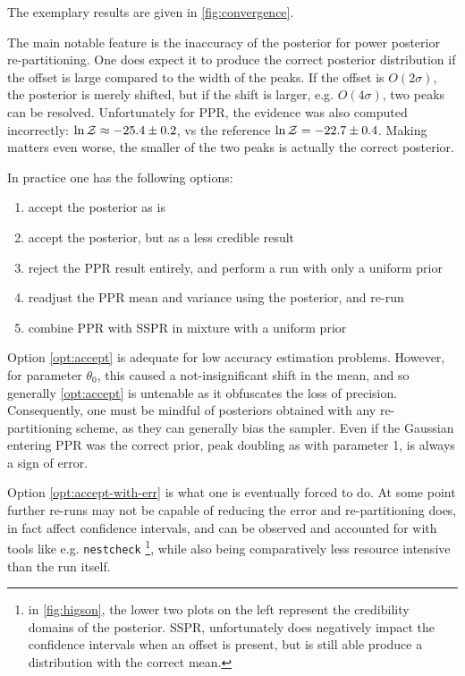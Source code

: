 \documentclass[usenatbib]{mnras}
\begin{document}
The exemplary results are given in \autoref{fig:convergence}.

The main notable feature is the inaccuracy of the posterior for
power posterior re-partitioning. One does expect it to produce the
correct posterior distribution if the offset is large compared to
the width of the peaks. If the offset is \(O(2\sigma)\), the
posterior is merely shifted, but if the shift is larger,
e.g. \(O(4\sigma)\), two peaks can be resolved. Unfortunately for
PPR, the evidence was also computed incorrectly: \(\ln {\cal
  Z}\approx -25.4 \pm 0.2\), vs the reference \(\ln {\cal Z} = -22.7 \pm
  0.4\).  Making matters even worse, the smaller of the two peaks is
actually the correct posterior.

In practice one has the following options: 
\begin{enumerate}
\item accept the posterior as is \label{opt:accept}
\item accept the posterior, but as a less credible result \label{opt:accept-with-err}
\item reject the PPR result entirely, and perform a run with only a uniform prior \label{opt:uniform}
\item readjust the PPR mean and variance using the posterior, and re-run \label{opt:shift}
\item combine PPR with SSPR in mixture with a uniform prior
\end{enumerate}
Option \ref{opt:accept} is adequate for low accuracy estimation
problems. However, for parameter \(\theta_{0}\), this caused a
not-insignificant shift in the mean, and so generally \ref{opt:accept}
is untenable as it obfuscates the loss of precision. Consequently,
one must be mindful of posteriors obtained with any re-partitioning
scheme, as they can generally bias the sampler. Even if the Gaussian
entering PPR was the correct prior, peak doubling as with parameter
1, is always a sign of error. 

Option \ref{opt:accept-with-err} is what one is eventually forced to
do. At some point further re-runs may not be capable of reducing the
error and re-partitioning does, in fact affect confidence intervals,
and can be observed and accounted for with tools like
e.g. \texttt{nestcheck} \footnote{in \autoref{fig:higson}, the lower two plots on
the left represent the credibility domains of the posterior. SSPR,
unfortunately does negatively impact the confidence intervals when
an offset is present, but is still able produce a distribution with
the correct mean.}, while also being comparatively less resource
intensive than the run itself.
\end{document}
